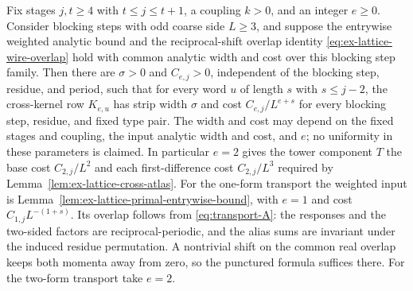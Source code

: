 \begin{theorem}
\label{thm:ex-lattice-wire-tower-strip}
Fix stages $j,t\geq4$ with $t\leq j\leq t+1$, a coupling $k>0$, and
an integer $e\geq0$. Consider blocking steps with odd coarse side $L\geq3$,
and suppose the entrywise weighted analytic bound and the reciprocal-shift
overlap identity \eqref{eq:ex-lattice-wire-overlap} hold with common
analytic width and cost over this blocking step family. Then there are $\sigma>0$
and $C_{e,j}>0$, independent of the blocking step,
residue, and period, such that for every word $u$ of length $s$ with
$s\leq j-2$, the cross-kernel row $K_{e,u}$ has strip width $\sigma$ and cost
$C_{e,j}/L^{e+s}$ for every blocking step, residue, and fixed type pair.
The width and cost may depend on the fixed stages and coupling, the input
analytic width and cost, and $e$; no uniformity in these parameters is claimed.
In particular $e=2$ gives the tower component $T$ the base cost
$C_{2,j}/L^2$ and each first-difference cost $C_{2,j}/L^3$ required by
Lemma~\ref{lem:ex-lattice-cross-atlas}.
For the one-form transport the weighted input is
Lemma~\ref{lem:ex-lattice-primal-entrywise-bound}, with $e=1$ and
cost $C_{1,j}L^{-(1+s)}$. Its overlap follows from
\eqref{eq:transport-A}: the responses and the two-sided factors
are reciprocal-periodic, and the alias sums are invariant under the
induced residue permutation. A nontrivial shift on the common real
overlap keeps both momenta away from zero, so the punctured formula
suffices there. For the two-form transport take $e=2$.
\end{theorem}

